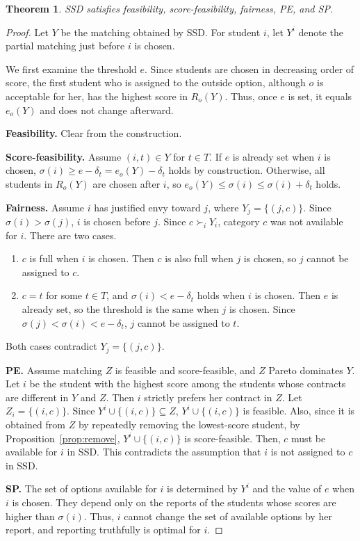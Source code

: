 \documentclass[a4paper,twoside]{article}
\newtheorem{theorem}{Theorem}
\theoremstyle{definition}
\begin{document}
\begin{theorem}
\label{thm:ssd}
SSD satisfies feasibility, score-feasibility, fairness, PE, and SP.
\end{theorem}
\begin{proof}
Let $Y$ be the matching obtained by SSD.
For student $i$, let $Y^i$ denote the partial matching just before $i$ is chosen.

We first examine the threshold $e$.
Since students are chosen in decreasing order of score, the first student who is
assigned to the outside option, although $o$ is acceptable for her, has the highest score
in $R_o(Y)$.
Thus, once $e$ is set, it equals $e_o(Y)$ and does not change afterward.

\textbf{Feasibility.} Clear from the construction.

\textbf{Score-feasibility.}
Assume $(i,t)\in Y$ for $t\in T$.
If $e$ is already set when $i$ is chosen, $\sigma(i)\ge e-\delta_t=e_o(Y)-\delta_t$ holds
by construction.
Otherwise, all students in $R_o(Y)$ are chosen after $i$, so
$e_o(Y)\leq \sigma(i)\le\sigma(i)+\delta_t$ holds.

\textbf{Fairness.}
Assume $i$ has justified envy toward $j$, where $Y_j=\{(j,c)\}$.
Since $\sigma(i)>\sigma(j)$, $i$ is chosen before $j$.
Since $c\succ_i Y_i$, category $c$ was not available for $i$.
There are two cases.
\begin{enumerate}
\item $c$ is full when $i$ is chosen.
Then $c$ is also full when $j$ is chosen, so $j$ cannot be assigned to $c$.
\item $c=t$ for some $t\in T$, and $\sigma(i)<e-\delta_t$ holds when $i$ is chosen.
Then $e$ is already set, so the threshold is the same when $j$ is chosen.
Since $\sigma(j)<\sigma(i)<e-\delta_t$, $j$ cannot be assigned to $t$.
\end{enumerate}
Both cases contradict $Y_j=\{(j,c)\}$.

\textbf{PE.}
Assume matching $Z$ is feasible and score-feasible, and $Z$ Pareto dominates $Y$.
Let $i$ be the student with the highest score among the students whose contracts are
different in $Y$ and $Z$.
Then $i$ strictly prefers her contract in $Z$. Let $Z_i=\{(i,c)\}$.
Since $Y^i \cup \{(i,c)\} \subseteq Z$, 
$Y^i \cup \{(i,c)\}$ is feasible. Also, since it is obtained from $Z$ by repeatedly 
removing the lowest-score student, by 
Proposition~\ref{prop:remove}, $Y^i \cup \{(i,c)\}$ is score-feasible. 
Then, $c$ must be available for $i$ in SSD. 
This contradicts the assumption that $i$ is not assigned to $c$ in SSD. 

\textbf{SP.}
The set of options available for $i$ is determined by $Y^i$ and the value of $e$ when $i$
is chosen.
They depend only on the reports of the students whose scores are higher than $\sigma(i)$.
Thus, $i$ cannot change the set of available options by her report, and reporting
truthfully is optimal for $i$.
\end{proof}
\end{document}
